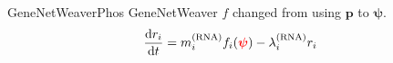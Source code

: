 \begin{frame}{GeneNetWeaverPhos}
GeneNetWeaver $f$ changed from using $\boldsymbol{p}$ to $\boldsymbol{\psi}$.
\begin{subequations}
\begin{align}
\dv{r_i}{t} &=
m_i^{(\text{RNA})} f_i(\textcolor{red}{\boldsymbol{\psi}}) - \lambda_i^{(\text{RNA})} r_i
\end{align}
\end{subequations}
\end{frame}


